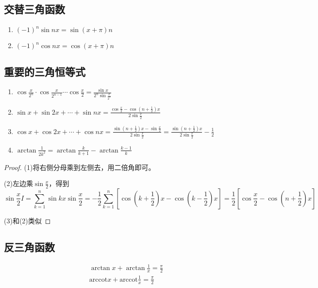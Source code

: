 \subsection{交替三角函数}

\begin{enumerate}
\item $(-1)^n \sin nx = \sin (x + \pi)n$
\item $(-1)^n \cos nx = \cos (x + \pi)n$
\end{enumerate}


\subsection{重要的三角恒等式}

\begin{enumerate}
\item $\cos \frac{x}{2^n} \cdot \cos \frac{x}{2^{n-1}} \cdots \cos \frac{x}{2}    = \frac{\sin x}{2^n \sin \frac{x}{2^n}}$
\item $\sin x + \sin 2x + \cdots + \sin nx = \frac{\cos \frac{x}{2} - \cos(n + \frac{1}{2})x}{2 \sin \frac{x}{2}}$
\item $\cos x + \cos 2x + \cdots + \cos nx = \frac{\sin (n+\frac{1}{2})x - \sin \frac{x}{2}}{2\sin \frac{x}{2}} = \frac{\sin(n+\frac{1}{2})x}{2 \sin \frac{x}{2}} - \frac{1}{2}$
\item $\arctan \frac{1}{2k^2} = \arctan \frac{k}{k+1} - \arctan \frac{k-1}{k}$
\end{enumerate}

\begin{proof}
  (1)将右侧分母乘到左侧去，用二倍角即可。

  (2)左边乘$\sin \frac{x}{2}$，得到
  \begin{equation*}
    \sin \frac{x}{2} I = \sum\limits_{k = 1}^n  \sin kx \sin \frac{x}{2} = - \frac{1}{2}\sum\limits_{k = 1}^n [\cos (k + \frac{1}{2})x - \cos(k - \frac{1}{2})x] = \frac{1}{2}\left[  \cos \frac{x}{2} - \cos(n + \frac{1}{2})x\right]
  \end{equation*}

  (3)和(2)类似
\end{proof}


\subsection{反三角函数}

\begin{theorem}[反三角函数倒数关系]
  \begin{gather*}
    \arctan x + \arctan \frac{1}{x} = \frac{\pi}{2}\\
    \text{arccot}x + \text{arccot}\frac{1}{x} = \frac{\pi}{2}
  \end{gather*}
\end{theorem}

